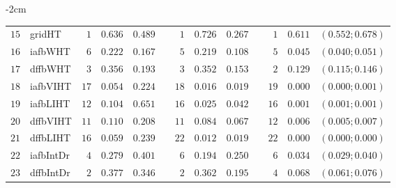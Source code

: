 \begin{table*}[!htbp]
\begin{adjustwidth*}{}{-2cm}
\begin{tabular}{@{}rlrrrrrrrrrcc@{}}
\footnotesize{$15$} & \footnotesize{gridHT   } & \footnotesize{$1 $} & \footnotesize{$0.636$} & \footnotesize{$0.489$} && \footnotesize{$1 $} & \footnotesize{$0.726$} & \footnotesize{$0.267$} && \footnotesize{$1 $} & \footnotesize{$0.611$} & \footnotesize{$(0.552;0.678)$} \\
\footnotesize{$16$} & \footnotesize{iafbWHT  } & \footnotesize{$6 $} & \footnotesize{$0.222$} & \footnotesize{$0.167$} && \footnotesize{$5 $} & \footnotesize{$0.219$} & \footnotesize{$0.108$} && \footnotesize{$5 $} & \footnotesize{$0.045$} & \footnotesize{$(0.040;0.051)$} \\
\footnotesize{$17$} & \footnotesize{dffbWHT  } & \footnotesize{$3 $} & \footnotesize{$0.356$} & \footnotesize{$0.193$} && \footnotesize{$3 $} & \footnotesize{$0.352$} & \footnotesize{$0.153$} && \footnotesize{$2 $} & \footnotesize{$0.129$} & \footnotesize{$(0.115;0.146)$} \\
\footnotesize{$18$} & \footnotesize{iafbVIHT } & \footnotesize{$17$} & \footnotesize{$0.054$} & \footnotesize{$0.224$} && \footnotesize{$18$} & \footnotesize{$0.016$} & \footnotesize{$0.019$} && \footnotesize{$19$} & \footnotesize{$0.000$} & \footnotesize{$(0.000;0.001)$} \\
\footnotesize{$19$} & \footnotesize{iafbLIHT } & \footnotesize{$12$} & \footnotesize{$0.104$} & \footnotesize{$0.651$} && \footnotesize{$16$} & \footnotesize{$0.025$} & \footnotesize{$0.042$} && \footnotesize{$16$} & \footnotesize{$0.001$} & \footnotesize{$(0.001;0.001)$} \\
\footnotesize{$20$} & \footnotesize{dffbVIHT } & \footnotesize{$11$} & \footnotesize{$0.110$} & \footnotesize{$0.208$} && \footnotesize{$11$} & \footnotesize{$0.084$} & \footnotesize{$0.067$} && \footnotesize{$12$} & \footnotesize{$0.006$} & \footnotesize{$(0.005;0.007)$} \\
\footnotesize{$21$} & \footnotesize{dffbLIHT } & \footnotesize{$16$} & \footnotesize{$0.059$} & \footnotesize{$0.239$} && \footnotesize{$22$} & \footnotesize{$0.012$} & \footnotesize{$0.019$} && \footnotesize{$22$} & \footnotesize{$0.000$} & \footnotesize{$(0.000;0.000)$} \\
\footnotesize{$22$} & \footnotesize{iafbIntDr} & \footnotesize{$4 $} & \footnotesize{$0.279$} & \footnotesize{$0.401$} && \footnotesize{$6 $} & \footnotesize{$0.194$} & \footnotesize{$0.250$} && \footnotesize{$6 $} & \footnotesize{$0.034$} & \footnotesize{$(0.029;0.040)$} \\
\footnotesize{$23$} & \footnotesize{dffbIntDr} & \footnotesize{$2 $} & \footnotesize{$0.377$} & \footnotesize{$0.346$} && \footnotesize{$2 $} & \footnotesize{$0.362$} & \footnotesize{$0.195$} && \footnotesize{$4 $} & \footnotesize{$0.068$} & \footnotesize{$(0.061;0.076)$} \\

\end{tabular}
\end{adjustwidth*}
\end{table*}
